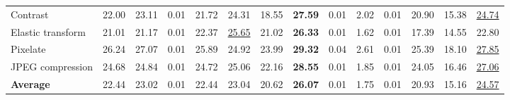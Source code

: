 \begin{table}[t]
{\begin{tabular}{lrrrrrrrrrrrrr}
Contrast & 22.00 & 23.11 & 0.01 & 21.72 & 24.31 & 18.55 & \textbf{27.59} & 0.01 & 2.02 & 0.01 & 20.90 & 15.38 & \underline{24.74} \\
Elastic transform & 21.01 & 21.17 & 0.01 & 22.37 & \underline{25.65} & 21.02 & \textbf{26.33} & 0.01 & 1.62 & 0.01 & 17.39 & 14.55 & 22.80 \\
Pixelate & 26.24 & 27.07 & 0.01 & 25.89 & 24.92 & 23.99 & \textbf{29.32} & 0.04 & 2.61 & 0.01 & 25.39 & 18.10 & \underline{27.85} \\
JPEG compression & 24.68 & 24.84 & 0.01 & 24.72 & 25.06 & 22.16 & \textbf{28.55} & 0.01 & 1.85 & 0.01 & 24.05 & 16.46 & \underline{27.06} \\
\midrule
\textbf{Average} & 22.44 & 23.02 & 0.01 & 22.44 & 23.04 & 20.62 & \textbf{26.07} & 0.01 & 1.75 & 0.01 & 20.93 & 15.16 & \underline{24.57} \\
\bottomrule
\end{tabular}%
}
\end{table}

